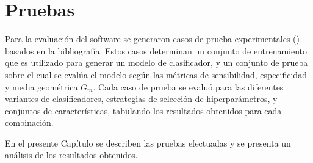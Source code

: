 %
%
%
%
\chapter{Pruebas}
%
Para la evaluación del software se generaron casos de prueba
experimentales () basados en la bibliografía.
Estos casos determinan un conjunto de entrenamiento que es utilizado
para generar un modelo de clasificador, y un conjunto de prueba sobre
el cual se evalúa el modelo según las métricas de sensibilidad,
especificidad y media geométrica $G_m$.
Cada caso de prueba se evaluó para las diferentes variantes de
clasificadores, estrategias de selección de hiperparámetros, y
conjuntos de características, tabulando los resultados obtenidos para
cada combinación.

En el presente Capítulo se describen las pruebas efectuadas y se
presenta un análisis de los resultados obtenidos.
